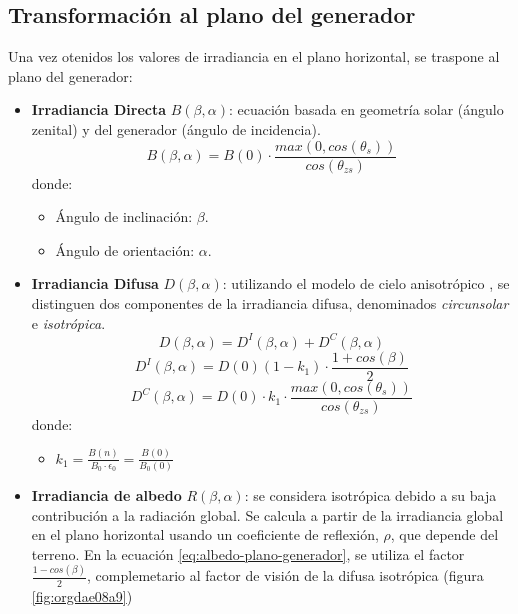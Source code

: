 \subsection{Transformación al plano del generador}
\label{sec:org7fae118}
\label{subsec:transformación-plano-generador}
Una vez otenidos los valores de irradiancia en el plano horizontal, se traspone al plano del generador:
\begin{itemize}
\item \textbf{Irradiancia Directa} \(B(\beta ,\alpha)\): ecuación basada en geometría solar (ángulo zenital) y del generador (ángulo de incidencia).
\begin{equation}
B(\beta ,\alpha)=B(0)\cdot \frac{max(0,cos(\theta_s))}{cos(\theta_{zs})}
\label{eq:irradiancia-directa-plano-generador}
\end{equation}
donde:
\begin{itemize}
\item Ángulo de inclinación: \(\beta\).
\item Ángulo de orientación: \(\alpha\). 
\end{itemize}
\item \textbf{Irradiancia Difusa} \(D(\beta ,\alpha)\): utilizando el modelo de cielo anisotrópico \cite{Perpinan2023}, se distinguen dos componentes de la irradiancia difusa, denominados \emph{circunsolar} e \emph{isotrópica}.  
\begin{equation}
D(\beta ,\alpha)=D^I(\beta ,\alpha)+D^C(\beta ,\alpha)
\end{equation}
\begin{equation}
D^I(\beta ,\alpha)=D(0)(1-k_1)\cdot \frac{1+cos(\beta)}{2}
\end{equation}
\begin{equation}
D^C(\beta, \alpha)=D(0)\cdot k_1\cdot \frac{max(0,cos(\theta_s))}{cos(\theta_{zs})}
\end{equation}
donde:
\begin{itemize}
\item \(k_1=\frac{B(n)}{B_0\cdot \epsilon_0}=\frac{B(0)}{B_0(0)}\)
\end{itemize}
\item \textbf{Irradiancia de albedo} \(R(\beta ,\alpha)\): se considera isotrópica debido a su baja contribución a la radiación global. Se calcula a partir de la irradiancia global en el plano horizontal usando un coeficiente de reflexión, \(\rho\), que depende del terreno. En la ecuación \ref{eq:albedo-plano-generador}, se utiliza el factor \(\frac{1-cos(\beta)}{2}\), complemetario al factor de visión de la difusa isotrópica (figura \ref{fig:orgdae08a9})

\end{itemize}
